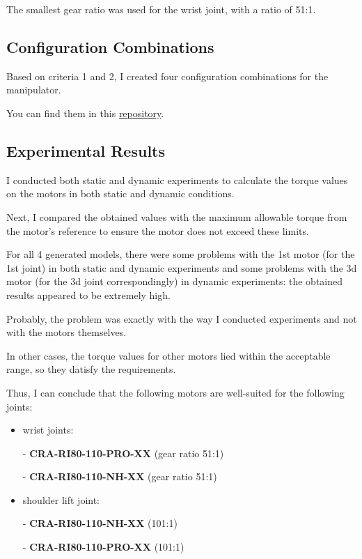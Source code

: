 \documentclass{article}
\begin{document}
The smallest gear ratio was used for the wrist joint, with a ratio of 51:1.

\subsection{Configuration Combinations}

Based on criteria 1 and 2, I created four configuration combinations for the manipulator.

You can find them in this \href{https://github.com/illusoryTwin/ActuatorSizing/tree/main}{repository}.

\subsection{Experimental Results}

I conducted both static and dynamic experiments to calculate the torque values on the motors in both static and dynamic conditions.  


Next, I compared the obtained values with the maximum allowable torque from the motor's reference to ensure the motor does not exceed these limits.  

For all 4 generated models, there were some problems with the 1st motor (for the 1st joint) in both static and dynamic experiments and some problems with the 3d motor (for the 3d joint correspondingly) in dynamic experiments: 
the obtained results appeared to be extremely high. 

Probably, the problem was exactly with the way I conducted experiments and not with the motors themselves.

In other cases, the torque values for other motors lied within the acceptable range, so they datisfy the requirements.  

Thus, I can conclude that the following motors are well-suited for the following joints:

\begin{itemize}
    \item wrist joints: 

        - \textbf{CRA-RI80-110-PRO-XX} (gear ratio 51:1)
        
        - \textbf{CRA-RI80-110-NH-XX} (gear ratio 51:1)

    \item shoulder lift joint:
    
        - \textbf{CRA-RI80-110-NH-XX} (101:1)
        
        - \textbf{CRA-RI80-110-PRO-XX} (101:1)
    
\end{itemize}
\end{document}
